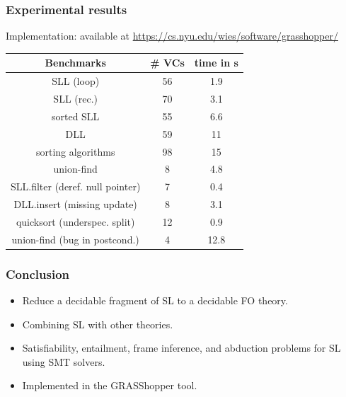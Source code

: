 \documentclass{beamer}
\begin{document}
\begin{frame}
  \frametitle{Experimental results}

Implementation: \Tool available at \url{https://cs.nyu.edu/wies/software/grasshopper/}

\begin{table}
  \centering
  \begin{tabular}{|c||c|c|}
    \hline
    Benchmarks &  \# VCs & time in s \\
    \hline
    SLL (loop)   &    56   &  1.9 \\
    SLL (rec.)   &    70   &  3.1 \\
    sorted SLL   &    55   &  6.6 \\
    DLL          &    59   &  11  \\
    sorting algorithms &    98   &  15  \\
    union-find   &     8   &  4.8 \\
    \hline
    \hline
    SLL.filter (deref. null pointer)  & 7 & 0.4 \\
    DLL.insert (missing update)  & 8 & 3.1 \\
    quicksort (underspec. split) & 12 & 0.9 \\
    union-find (bug in postcond.)   & 4 & 12.8 \\
    \hline
  \end{tabular}%
\end{table}

\end{frame}

\begin{frame}
  \frametitle{Conclusion}

  \begin{itemize}
  \item Reduce a decidable fragment of SL to a decidable FO theory.
  \item Combining SL with other theories.
  \item Satisfiability, entailment, frame inference, and abduction problems for SL using SMT solvers.
  \item Implemented in the GRASShopper tool.
  \end{itemize}

\end{frame}
\end{document}
